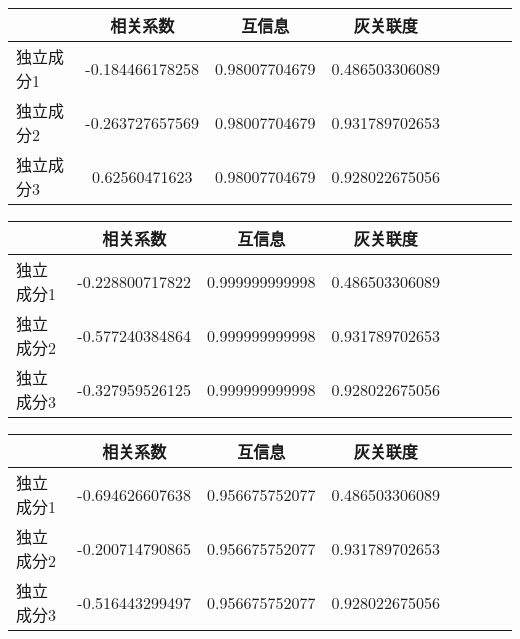 \begin{table}[!tphb] 
\begin{center}
\begin{tabular}{lccclccc} 
 \toprule 
& 相关系数   & 互信息    &灰关联度 \\ 
\midrule 
独立成分1	& -0.184466178258	& 0.98007704679	& 0.486503306089	\\ 
独立成分2	& -0.263727657569	& 0.98007704679	& 0.931789702653	\\ 
独立成分3	& 0.62560471623	& 0.98007704679	& 0.928022675056	\\ 
\bottomrule 
 \end{tabular} 
\end{center} 
 \end{table} 


\begin{table}[!tphb] 
\begin{center}
\begin{tabular}{lccclccc} 
 \toprule 
& 相关系数   & 互信息    &灰关联度 \\ 
\midrule 
独立成分1	& -0.228800717822	& 0.999999999998	& 0.486503306089	\\ 
独立成分2	& -0.577240384864	& 0.999999999998	& 0.931789702653	\\ 
独立成分3	& -0.327959526125	& 0.999999999998	& 0.928022675056	\\ 
\bottomrule 
 \end{tabular} 
\end{center} 
 \end{table} 


\begin{table}[!tphb] 
\begin{center}
\begin{tabular}{lccclccc} 
 \toprule 
& 相关系数   & 互信息    &灰关联度 \\ 
\midrule 
独立成分1	& -0.694626607638	& 0.956675752077	& 0.486503306089	\\ 
独立成分2	& -0.200714790865	& 0.956675752077	& 0.931789702653	\\ 
独立成分3	& -0.516443299497	& 0.956675752077	& 0.928022675056	\\ 
\bottomrule 
 \end{tabular} 
\end{center} 
 \end{table} 
